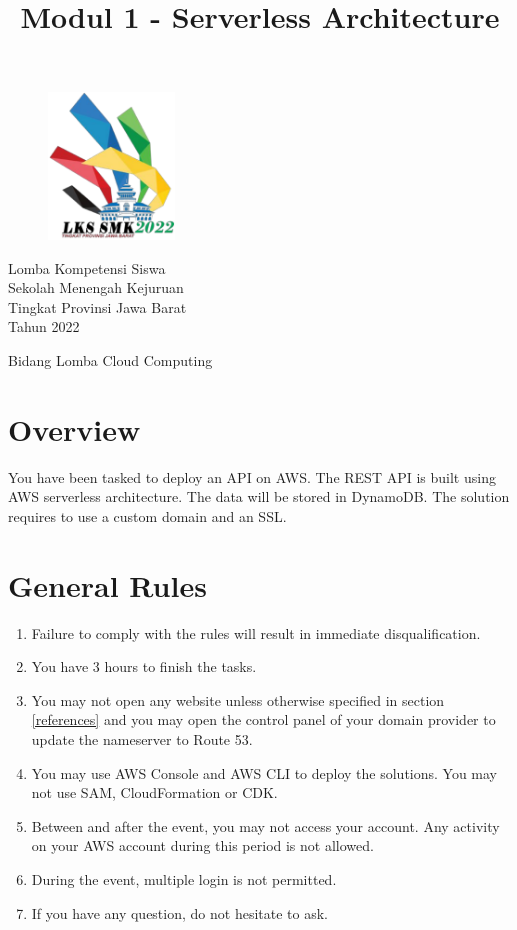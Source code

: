 \documentclass{article}
\title{Modul 1 - Serverless Architecture}
\author{}
\begin{document}
\lstset{language=Bash,upquote=true}
\begin{figure}[h]
\centering
\includegraphics[width=0.3\textwidth]{logo.png}
\end{figure}
\centering
{\huge
Lomba Kompetensi Siswa\\
Sekolah Menengah Kejuruan\\
Tingkat Provinsi Jawa Barat\\
Tahun 2022\\
\vspace{10mm} %
}
\vspace{30mm} %
{\let\newpage\relax\maketitle}
\vspace{30mm} %
{\LARGE Bidang Lomba Cloud Computing}

\thispagestyle{empty}
\newpage
\raggedright
{}

\section{Overview}
You have been tasked to deploy an API on AWS. The REST API is built using AWS serverless architecture. The data will be stored in DynamoDB. The solution requires to use a custom domain and an SSL.
\section{General Rules}
\begin{enumerate}
    \item Failure to comply with the rules will result in immediate disqualification.
    \item You have 3 hours to finish the tasks.
    \item You may not open any website unless otherwise specified in section \ref{references} and you may open the control panel of your domain provider to update the nameserver to Route 53.
    \item You may use AWS Console and AWS CLI to deploy the solutions. You may not use SAM, CloudFormation or CDK.
    \item Between and after the event, you may not access your account. Any activity on your AWS account during this period is not allowed.
    \item During the event, multiple login is not permitted.
    \item If you have any question, do not hesitate to ask.
\end{enumerate}
\end{document}
